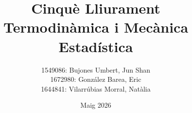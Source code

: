 \documentclass[a4paper, 10pt]{article}
\begin{document}
	\title{\Huge{\textbf{Cinquè Lliurament}} \\ \vspace{0.2cm} \large{\textbf{Termodinàmica i Mecànica Estadística}}}
	
	\author{\small{1549086: Bujones Umbert, Jun Shan} \\
		\small{1672980: González Barea, Eric} \\
		\small{1644841: Vilarrúbias Morral, Natàlia}}
	\date{Maig 2026}
	\maketitle
	
	\thispagestyle{fancy}
\end{document}
